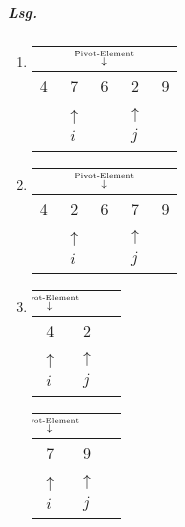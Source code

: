 \documentclass{scrreprt}
\begin{document}
\subparagraph{Lsg.}
\begin{enumerate}[label={\arabic*. Schritt}]
\item
  \begin{tabular}{ccccc}
    & & $\substack{\makebox[0pt]{\tiny Pivot-Element} \\ \downarrow}$ \\
    \hline
    \multicolumn{1}{|c}{4} & \multicolumn{1}{|c}{7} & \multicolumn{1}{|c}{6} & \multicolumn{1}{|c}{2} & \multicolumn{1}{|c|}{9} \\
    \hline
    & $\substack{\uparrow \\ i}$ & & $\substack{\uparrow \\ j}$
  \end{tabular}

\item
  \begin{tabular}{ccccc}
    & & $\substack{\makebox[0pt]{\tiny Pivot-Element} \\ \downarrow}$ \\
    \hline
    \multicolumn{1}{|c}{4} & \multicolumn{1}{|c}{2} & \multicolumn{1}{|c}{6} & \multicolumn{1}{|c}{7} & \multicolumn{1}{|c|}{9} \\
    \hline
    & $\substack{\uparrow \\ i}$ & & $\substack{\uparrow \\ j}$
  \end{tabular}

\item
  \begin{minipage}[t]{.4\textwidth}
     \begin{tabular}{ccc}
       $\substack{\makebox[0pt]{\tiny Pivot-Element} \\ \downarrow}$ \\
       \hline
       \multicolumn{1}{|c}{4} & \multicolumn{1}{|c|}{2} \\
       \hline
       $\substack{\uparrow \\ i}$ & $\substack{\uparrow \\ j}$ \\
     \end{tabular}
  \end{minipage}
  \hfill
  \vrule
  \hfill
  \begin{minipage}[t]{.4\textwidth}
    \begin{tabular}{ccc}
      $\substack{\makebox[0pt]{\tiny Pivot-Element} \\ \downarrow}$ \\
      \hline
      \multicolumn{1}{|c}{7} & \multicolumn{1}{|c|}{9} \\
      \hline
      $\substack{\uparrow \\ i}$ & $\substack{\uparrow \\ j}$
    \end{tabular}
  \end{minipage}


\end{enumerate}
\end{document}
